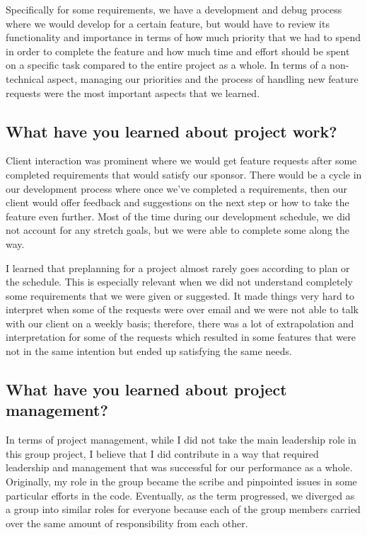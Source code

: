 \documentclass[draftclsnofoot,10pt,onecolumn]{IEEEtran} %
\begin{document}
Specifically for some requirements, we have a development and debug process
where we would develop for a certain feature, but would have to review its
functionality and importance in terms of how much priority that we had to spend
in order to complete the feature and how much time and effort should be spent on
a specific task compared to the entire project as a whole. In terms of a
non-technical aspect, managing our priorities and the process of handling new
feature requests were the most important aspects that we learned.

\subsection{What have you learned about project work?}
Client interaction was prominent where we would get feature requests after some
completed requirements that would satisfy our sponsor. There would be a cycle in
our development process where once we’ve completed a requirements, then our
client would offer feedback and suggestions on the next step or how to take the
feature even further. Most of the time during our development schedule, we did
not account for any stretch goals, but we were able to complete some along the
way.

I learned that preplanning for a project almost rarely goes according to plan or
the schedule. This is especially relevant when we did not understand completely
some requirements that we were given or suggested. It made things very hard to
interpret when some of the requests were over email and we were not able to talk
with our client on a weekly basis; therefore, there was a lot of extrapolation
and interpretation for some of the requests which resulted in some features that
were not in the same intention but ended up satisfying the same needs.

\subsection{What have you learned about project management?}
In terms of project management, while I did not take the main leadership role in this group project, I believe that I did contribute in a way that required leadership and management that was successful for our performance as a whole. Originally, my role in the group became the scribe and pinpointed issues in some particular efforts in the code. Eventually, as the term progressed, we diverged as a group into similar roles for everyone because each of the group members carried over the same amount of responsibility from each other.
\end{document}
